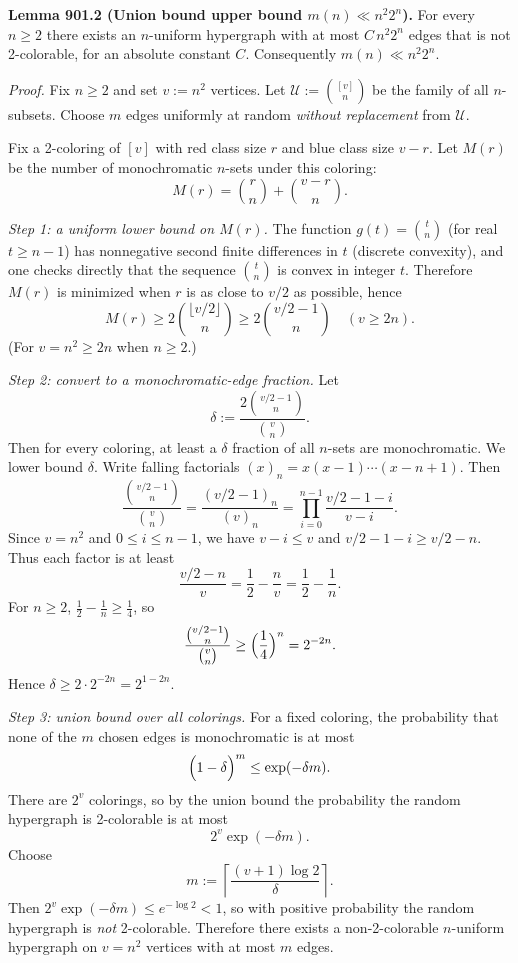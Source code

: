 \medskip
\noindent\textbf{Lemma 901.2 (Union bound upper bound $m(n)\ll n^2 2^n$).}
For every $n\ge 2$ there exists an $n$-uniform hypergraph with at most
$C\,n^2 2^n$ edges that is not 2-colorable, for an absolute constant $C$.
Consequently $m(n)\ll n^2 2^n$.

\emph{Proof.}
Fix $n\ge 2$ and set $v:=n^2$ vertices. Let $\mathcal{U}:=\binom{[v]}{n}$ be the
family of all $n$-subsets.
Choose $m$ edges uniformly at random \emph{without replacement} from $\mathcal{U}$.

Fix a 2-coloring of $[v]$ with red class size $r$ and blue class size $v-r$.
Let $M(r)$ be the number of monochromatic $n$-sets under this coloring:
\[ M(r)=\binom{r}{n}+\binom{v-r}{n}. \]

\emph{Step 1: a uniform lower bound on $M(r)$.}
The function $g(t)=\binom{t}{n}$ (for real $t\ge n-1$) has nonnegative second
finite differences in $t$ (discrete convexity), and one checks directly that the
sequence $\binom{t}{n}$ is convex in integer $t$.
Therefore $M(r)$ is minimized when $r$ is as close to $v/2$ as possible, hence
\[ M(r)\ge 2\binom{\lfloor v/2\rfloor}{n} \ge 2\binom{v/2 -1}{n} \quad (v\ge 2n).
\]
(For $v=n^2\ge 2n$ when $n\ge 2$.)

\emph{Step 2: convert to a monochromatic-edge fraction.}
Let
\[ \delta := \frac{2\binom{v/2 -1}{n}}{\binom{v}{n}}.
\]
Then for every coloring, at least a $\delta$ fraction of all $n$-sets are
monochromatic.
We lower bound $\delta$.
Write falling factorials $(x)_n=x(x-1)\cdots(x-n+1)$.
Then
\[
\frac{\binom{v/2 -1}{n}}{\binom{v}{n}}
=\frac{(v/2-1)_n}{(v)_n}
=\prod_{i=0}^{n-1}\frac{v/2-1-i}{v-i}.
\]
Since $v=n^2$ and $0\le i\le n-1$, we have $v-i\le v$ and
$v/2-1-i \ge v/2 - n$.
Thus each factor is at least
\[
\frac{v/2-n}{v}=\frac12-\frac{n}{v}=\frac12-\frac1n.
\]
For $n\ge 2$, $\frac12-\frac1n\ge \frac14$, so
\[
\frac{\binom{v/2 -1}{n}}{\binom{v}{n}} \ge \Bigl(\frac14\Bigr)^n = 2^{-2n}.
\]
Hence $\delta\ge 2\cdot 2^{-2n}=2^{1-2n}$.

\emph{Step 3: union bound over all colorings.}
For a fixed coloring, the probability that none of the $m$ chosen edges is
monochromatic is at most
\[
\Bigl(1-\delta\Bigr)^m \le \exp(-\delta m).
\]
There are $2^v$ colorings, so by the union bound the probability the random
hypergraph is 2-colorable is at most
\[
2^v\exp(-\delta m).
\]
Choose
\[ m:= \left\lceil \frac{(v+1)\log 2}{\delta}\right\rceil.
\]
Then $2^v\exp(-\delta m)\le e^{-\log 2}<1$, so with positive probability the
random hypergraph is \emph{not} 2-colorable.
Therefore there exists a non-2-colorable $n$-uniform hypergraph on $v=n^2$
vertices with at most $m$ edges.

